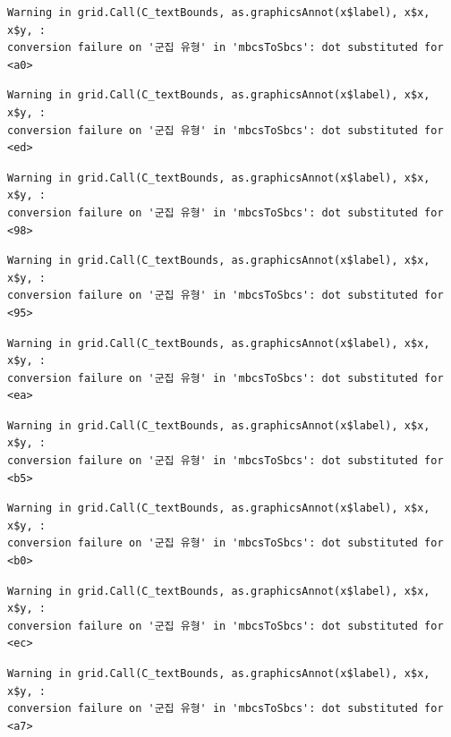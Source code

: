 \documentclass[
  letterpaper,
  DIV=11,
  numbers=noendperiod]{scrreprt}
\begin{document}
\begin{verbatim}
Warning in grid.Call(C_textBounds, as.graphicsAnnot(x$label), x$x, x$y, :
conversion failure on '군집 유형' in 'mbcsToSbcs': dot substituted for <a0>
\end{verbatim}

\begin{verbatim}
Warning in grid.Call(C_textBounds, as.graphicsAnnot(x$label), x$x, x$y, :
conversion failure on '군집 유형' in 'mbcsToSbcs': dot substituted for <ed>
\end{verbatim}

\begin{verbatim}
Warning in grid.Call(C_textBounds, as.graphicsAnnot(x$label), x$x, x$y, :
conversion failure on '군집 유형' in 'mbcsToSbcs': dot substituted for <98>
\end{verbatim}

\begin{verbatim}
Warning in grid.Call(C_textBounds, as.graphicsAnnot(x$label), x$x, x$y, :
conversion failure on '군집 유형' in 'mbcsToSbcs': dot substituted for <95>
\end{verbatim}

\begin{verbatim}
Warning in grid.Call(C_textBounds, as.graphicsAnnot(x$label), x$x, x$y, :
conversion failure on '군집 유형' in 'mbcsToSbcs': dot substituted for <ea>
\end{verbatim}

\begin{verbatim}
Warning in grid.Call(C_textBounds, as.graphicsAnnot(x$label), x$x, x$y, :
conversion failure on '군집 유형' in 'mbcsToSbcs': dot substituted for <b5>
\end{verbatim}

\begin{verbatim}
Warning in grid.Call(C_textBounds, as.graphicsAnnot(x$label), x$x, x$y, :
conversion failure on '군집 유형' in 'mbcsToSbcs': dot substituted for <b0>
\end{verbatim}

\begin{verbatim}
Warning in grid.Call(C_textBounds, as.graphicsAnnot(x$label), x$x, x$y, :
conversion failure on '군집 유형' in 'mbcsToSbcs': dot substituted for <ec>
\end{verbatim}

\begin{verbatim}
Warning in grid.Call(C_textBounds, as.graphicsAnnot(x$label), x$x, x$y, :
conversion failure on '군집 유형' in 'mbcsToSbcs': dot substituted for <a7>
\end{verbatim}
\end{document}
